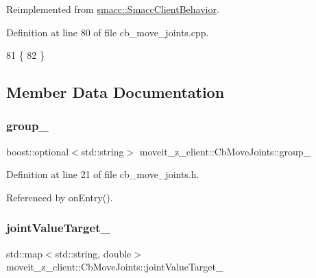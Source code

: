 Reimplemented from \hyperlink{classsmacc_1_1SmaccClientBehavior_a7e4fb6ce81ff96dc172425852d69c0c5}{smacc\+::\+Smacc\+Client\+Behavior}.



Definition at line 80 of file cb\+\_\+move\+\_\+joints.\+cpp.


\begin{DoxyCode}
81   \{
82   \}
\end{DoxyCode}


\subsection{Member Data Documentation}
\mbox{\label{classmoveit__z__client_1_1CbMoveJoints_ac75cb07d2292b2080266c36e4d18fc41}} 
\subsubsection{\texorpdfstring{group\+\_\+}{group\_}}
{\footnotesize\ttfamily boost\+::optional$<$std\+::string$>$ moveit\+\_\+z\+\_\+client\+::\+Cb\+Move\+Joints\+::group\+\_\+}



Definition at line 21 of file cb\+\_\+move\+\_\+joints.\+h.



Referenced by on\+Entry().

\mbox{\label{classmoveit__z__client_1_1CbMoveJoints_a0f52577dd2fccf25f36c4c93e733c0f4}} 
\subsubsection{\texorpdfstring{joint\+Value\+Target\+\_\+}{jointValueTarget\_}}
{\footnotesize\ttfamily std\+::map$<$std\+::string, double$>$ moveit\+\_\+z\+\_\+client\+::\+Cb\+Move\+Joints\+::joint\+Value\+Target\+\_\+}



